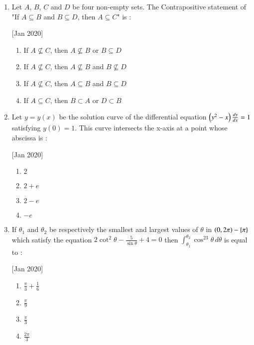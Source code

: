 \documentclass[journal,12pt,twocolumn]{IEEEtran}
\theoremstyle{remark}
\begin{document}
\begin{enumerate}
    \hfill[Jan 2020]
        \begin{enumerate}
            \item $\frac{32}{5}$
            \item $\frac{52}{5}$
            \item $\frac{56}{5}$
            \item $\frac{64}{5}$
        \end{enumerate}

    \item Let $A$, $B$, $C$ and $D$ be four non-empty sets. The Contrapositive statement of "If $A \subseteq B$ and $B \subseteq D$, then $A \subseteq C$" is :
    
    \hfill[Jan 2020]
        \begin{enumerate}
            \item If $A \nsubseteq C$, then $A \nsubseteq B$ or $B \subseteq D$
            \item If $A \nsubseteq C$, then $A \nsubseteq B$ and $B \nsubseteq D$
            \item If $A \nsubseteq C$, then $A \subseteq B$ and $B \subseteq D$
            \item If $A \subseteq C$, then $B \subset A$ or $D \subset B$
        \end{enumerate}

    \item Let $y=y(x)$ be the solution curve of the differential equation $\left(y^2-x\right)\frac{dy}{dx}=1$ satisfying $y(0)=1$. This curve intersects the x-axis at a point whose abscissa is :
    
    \hfill[Jan 2020]
        \begin{enumerate}
            \item $2$
            \item $2+e$
            \item $2-e$
            \item $-e$
        \end{enumerate}

    \item If $\theta_1$ and $\theta_2$ be respectively the smallest and largest values of $\theta$ in $\left(0,2\pi\right)-\left\{\pi\right\}$ which satisfy the equation $2\cot^2\theta-\frac{5}{\sin\theta}+4=0$ then $\int_{\theta_1}^{\theta_2}\cos^23\theta\,d\theta$ is equal to :
    
    \hfill[Jan 2020]
        \begin{enumerate}
            \item $\frac{\pi}{3}+\frac{1}{6}$
            \item $\frac{\pi}{9}$
            \item $\frac{\pi}{3}$
            \item $\frac{2\pi}{3}$
        \end{enumerate}


\end{enumerate}
\end{document}
